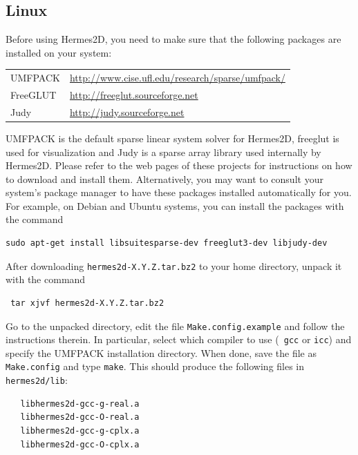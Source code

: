 
\subsection{Linux}

\lstset{language=make}

Before using Hermes2D, you need to make sure that the following packages are installed
on your system:

\begin{center}
\begin{tabular}{ll}
  UMFPACK & \url{http://www.cise.ufl.edu/research/sparse/umfpack/} \\
  FreeGLUT & \url{http://freeglut.sourceforge.net} \\
  Judy & \url{http://judy.sourceforge.net}
\end{tabular}
\end{center}

UMFPACK is the default sparse linear system solver for Hermes2D,
freeglut is  used for visualization and Judy is a sparse array library
used internally by Hermes2D. Please refer to the web pages of these projects for
instructions on how to download and install them. Alternatively, you may want to
consult your system's package manager to have these packages
installed automatically for you. For example, on Debian and Ubuntu systems, you
can install the packages with the command 
\begin{lstlisting}
sudo apt-get install libsuitesparse-dev freeglut3-dev libjudy-dev
\end{lstlisting}

After downloading \verb"hermes2d-X.Y.Z.tar.bz2" to your home directory, unpack it with 
the command
\begin{lstlisting}
 tar xjvf hermes2d-X.Y.Z.tar.bz2
\end{lstlisting}

Go to the unpacked directory, edit the file \verb"Make.config.example" and
follow the instructions therein. In particular, select which compiler to use ({\tt
gcc} or {\tt icc}) and specify the UMFPACK installation directory. When done,
save the file as {\tt Make.config} and type {\tt make}. This should
produce the following files in {\tt hermes2d/lib}:
{\small\begin{verbatim}
   libhermes2d-gcc-g-real.a
   libhermes2d-gcc-O-real.a
   libhermes2d-gcc-g-cplx.a
   libhermes2d-gcc-O-cplx.a
\end{verbatim}}

